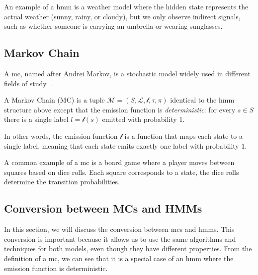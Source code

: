 An example of a \gls{hmm} is a weather model where the hidden state represents the actual weather (sunny, rainy, or cloudy), but we only observe indirect signals, such as whether someone is carrying an umbrella or wearing sunglasses.

\subsection{Markov Chain}\label{subsec:mc}
A \acrfull{mc}, named after Andrei Markov, is a stochastic model widely used in different fields of study~\cite{Rabiner89}.
\begin{definition}
    A Markov Chain (MC) is a tuple $\mathcal{M} = (S, \mathcal{L}, \mathscr{l}, \tau,  \pi)$ identical to the \gls{hmm} structure above except that the emission function is
    \emph{deterministic}: for every $s\in S$ there is a single label
    $l=\mathscr{l}(s)$ emitted with probability 1.
\end{definition}
In other words, the emission function $\mathscr{l}$ is a function that maps each state to a single label, meaning that each state emits exactly one label with probability 1.

A common example of a \gls{mc} is a board game where a player moves between squares based on dice rolls.
Each square corresponds to a state, the dice rolls determine the transition probabilities.

\subsection{Conversion between MCs and HMMs}\label{subsec:mc_hmm_conversion}
In this section, we will discuss the conversion between \glspl{mc} and \glspl{hmm}.
This conversion is important because it allows us to use the same algorithms and techniques for both models, even though they have different properties.
From the definition of a \gls{mc}, we can see that it is a special case of an \gls{hmm} where the emission function is deterministic.

